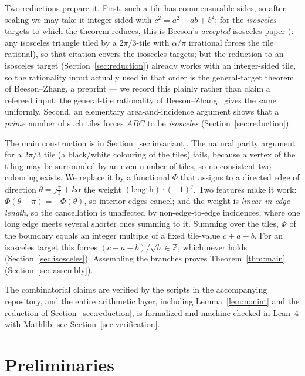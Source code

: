 \documentclass[11pt,reqno]{amsart}
\theoremstyle{plain}
\theoremstyle{definition}
\newcommand{\Z}{\mathbb{Z}}
\begin{document}
Two reductions prepare it. First, such a tile has commensurable sides, so after scaling we may take
it integer-sided with $c^2=a^2+ab+b^2$; for the \emph{isosceles} targets to which the theorem
reduces, this is Beeson's \emph{accepted} isosceles paper (\cite[Thm.~12.5]{BeesonIso}: any
isosceles triangle tiled by a $2\pi/3$-tile with $\alpha/\pi$ irrational forces the tile rational),
so that citation covers the isosceles targets; but the reduction to an isosceles
target (Section~\ref{sec:reduction}) already works with an integer-sided tile, so the rationality
input actually used in that order is the general-target theorem of Beeson--Zhang, a preprint --- we
record this plainly rather than claim a refereed input; the general-tile rationality of
Beeson--Zhang~\cite{BeesonZhang} gives the same uniformly. Second, an elementary
area-and-incidence argument shows that a \emph{prime} number of such tiles forces $ABC$ to be
\emph{isosceles} (Section~\ref{sec:reduction}).

The main construction is in Section~\ref{sec:invariant}. The natural parity argument for a $2\pi/3$
tile (a black/white colouring of the tiles) fails, because a vertex of the tiling may be surrounded
by an even number of tiles, so no consistent two-colouring exists. We replace it by a functional
$\Phi$ that assigns to a directed edge of direction $\theta=j\frac\pi3+k\alpha$ the weight
$(\text{length})\cdot(-1)^j$. Two features make it work: $\Phi(\theta+\pi)=-\Phi(\theta)$, so
interior edges cancel; and the weight is \emph{linear in edge length}, so the cancellation is
unaffected by non-edge-to-edge incidences, where one long edge meets several shorter ones summing
to it. Summing over the tiles, $\Phi$ of the boundary equals an integer multiple of a fixed
tile-value $c+a-b$. For an isosceles target this forces $(c-a-b)/\sqrt b\in\Z$, which never holds
(Section~\ref{sec:isosceles}). Assembling the branches proves Theorem~\ref{thm:main}
(Section~\ref{sec:assembly}).

The combinatorial claims are verified by the scripts in the accompanying repository, and the entire
arithmetic layer, including Lemma~\ref{lem:nonint} and the reduction of Section~\ref{sec:reduction},
is formalized and machine-checked in Lean~4 with Mathlib; see Section~\ref{sec:verification}.

\section{Preliminaries}\label{sec:prelim}
\end{document}
